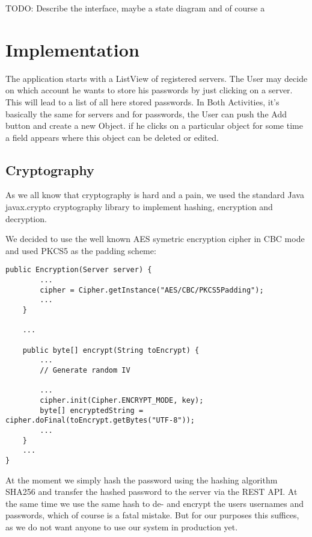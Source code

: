 \documentclass{report}
\begin{document}
TODO: Describe the interface, maybe a state diagram and of course a 








\section{Implementation}
The application starts with a ListView of registered servers. The User may decide on which account he wants to store his passwords by just clicking on a server. This will lead to a list of all here  stored passwords. In Both Activities, it's basically the same for servers and for passwords, the User can push the Add button and create a new Object. if he clicks on a particular object for some time a field appears where this object can be deleted or edited. 

\subsection{Cryptography}
As we all know that cryptography is hard and a pain, we used the standard Java javax.crypto cryptography library to implement hashing, encryption and decryption.

We decided to use the well known AES symetric encryption cipher in CBC mode and used PKCS5 as the padding scheme:

\begin{lstlisting}
public Encryption(Server server) {
        ...
        cipher = Cipher.getInstance("AES/CBC/PKCS5Padding");
        ...
    }
    
    ...
    
    public byte[] encrypt(String toEncrypt) {
        ...
        // Generate random IV
        
		...        
        cipher.init(Cipher.ENCRYPT_MODE, key);
        byte[] encryptedString = cipher.doFinal(toEncrypt.getBytes("UTF-8"));
        ...
    }
    ...
}
\end{lstlisting}

At the moment we simply hash the password using the hashing algorithm SHA256 and transfer the hashed password to the server via the REST API. At the same time we use the same hash to de- and encrypt the users usernames and passwords, which of course is a fatal mistake. But for our purposes this suffices, as we do not want anyone to use our system in production yet.
\end{document}
